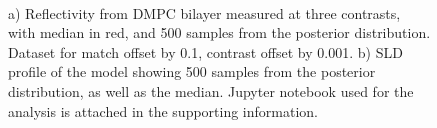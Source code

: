\documentclass[12pt]{article}
\begin{document}
\begin{figure}%
\centering
{}\hspace{1em}%
\\%
\caption{a) Reflectivity from DMPC bilayer measured at three contrasts, with median in red, and 500 samples from the posterior distribution. Dataset for  match offset by 0.1,  contrast offset by 0.001. b) SLD profile of the  model showing 500 samples from the posterior distribution, as well as the median. Jupyter notebook used for the analysis is attached in the supporting information.}
\end{figure}
\end{document}
